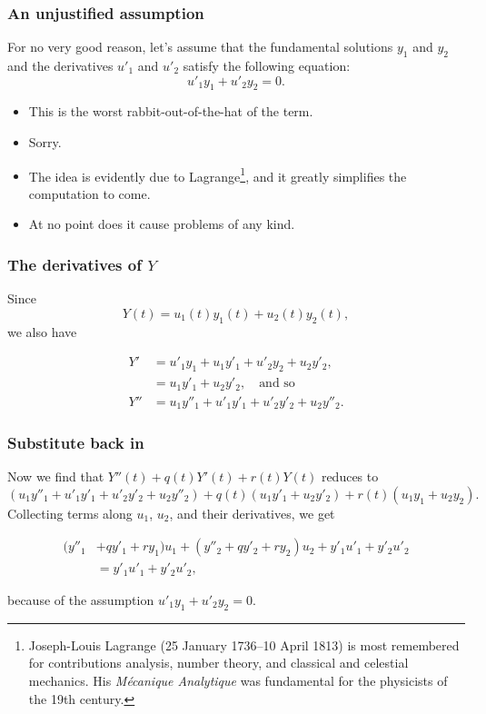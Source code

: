 \begin{frame}

\frametitle{An unjustified assumption}
\label{anunjustifiedassumption}

For no very good reason, let's assume that the fundamental solutions $ y_1 $ and $ y_2 $ and the derivatives $ u'_1 $ and $ u'_2 $ satisfy the following equation:
\[
    u'_1 y_1 + u'_2 y_2  = 0.
\]

\begin{itemize}
\item This is the worst rabbit-out-of-the-hat of the term.

\item Sorry.

\item The idea is evidently due to Lagrange\footnote{Joseph-Louis Lagrange (25 January 1736--10 April 1813) is most remembered for contributions analysis, number theory, and classical and celestial mechanics. His \emph{M\'ecanique Analytique} was fundamental for the physicists of the 19th century.}, and it greatly simplifies the computation to come.

\item At no point does it cause problems of any kind.

\end{itemize}

\end{frame}

\begin{frame}

\frametitle{The derivatives of $ Y $}
\label{thederivativesofy}

Since
\[
    Y(t) = u_1(t) y_1(t) + u_2(t) y_2(t),
\]
we also have

\begin{align*}
    Y'  &= u'_1 y_1 + u_1 y'_1 + u'_2 y_2 + u_2 y'_2, \\
        &= u_1 y'_1 + u_2 y'_2, \quad \text{and so} \\
    Y'' &= u_1 y''_1 + u'_1 y'_1 + u'_2 y'_2 + u_2 y''_2.
\end{align*}


\end{frame}

\begin{frame}

\frametitle{Substitute back in}
\label{substitutebackin}

Now we find that $ Y''(t) + q(t)Y'(t) + r(t)Y(t) $ reduces to
\[
    (u_1 y''_1 + u'_1 y'_1 + u'_2 y'_2 + u_2 y''_2) + q(t)(u_1 y'_1 + u_2 y'_2) + r(t)(u_1 y_1 + u_2 y_2).
\]
Collecting terms along $ u_1 $, $ u_2 $, and their derivatives, we get
 
\begin{align*}
    (y''_1  & + qy'_1 + ry_1)u_1 + (y''_2 + qy'_2 + ry_2)u_2 + y'_1 u'_1 + y'_2 u'_2 \\
    &= y'_1 u'_1 + y'_2 u'_2,
\end{align*}
 
because of the assumption $ u'_1 y_1 + u'_2 y_2  = 0 $.

\end{frame}


